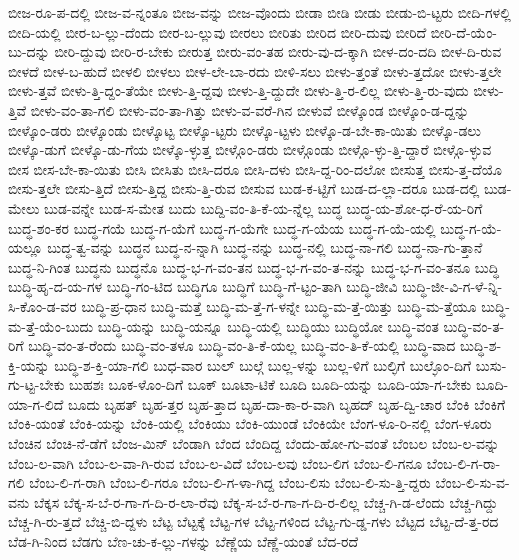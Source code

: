 {ಬೀಜ-ರೂ-ಪ-ದಲ್ಲಿ
ಬೀಜ-ವ-ನ್ನಂತೂ
ಬೀಜ-ವನ್ನು
ಬೀಜ-ವೊಂದು
ಬೀಡಾ
ಬೀಡಿ
ಬೀಡು
ಬೀಡು-ಬಿ-ಟ್ಟರು
ಬೀದಿ-ಗಳಲ್ಲಿ
ಬೀದಿ-ಯಲ್ಲಿ
ಬೀರ-ಬ-ಲ್ಲು-ದೆಂದು
ಬೀರ-ಬ-ಲ್ಲುವು
ಬೀರಲು
ಬೀರಿತು
ಬೀರಿದ
ಬೀರಿ-ದುವು
ಬೀರಿದೆ
ಬೀರಿ-ದೆ-ಯೆಂ-ಬು-ದನ್ನು
ಬೀರಿ-ದ್ದುವು
ಬೀರಿ-ರ-ಬೇಕು
ಬೀರುತ್ತ
ಬೀರು-ವಂ-ತಹ
ಬೀರು-ವು-ದ-ಕ್ಕಾಗಿ
ಬೀಳ-ದಂ-ದದಿ
ಬೀಳ-ದಿ-ರುವ
ಬೀಳದೆ
ಬೀಳ-ಬ-ಹುದೆ
ಬೀಳಲಿ
ಬೀಳಲು
ಬೀಳ-ಲೇ-ಬಾ-ರದು
ಬೀಳಿ-ಸಲು
ಬೀಳು-ತ್ತಂತೆ
ಬೀಳು-ತ್ತದೋ
ಬೀಳು-ತ್ತಲೇ
ಬೀಳು-ತ್ತವೆ
ಬೀಳು-ತ್ತಿ-ದ್ದಂ-ತೆಯೇ
ಬೀಳು-ತ್ತಿ-ದ್ದವು
ಬೀಳು-ತ್ತಿ-ದ್ದುದೇ
ಬೀಳು-ತ್ತಿ-ರ-ಲಿಲ್ಲ
ಬೀಳು-ತ್ತಿ-ರು-ವುದು
ಬೀಳು-ತ್ತಿವೆ
ಬೀಳು-ವಂ-ತಾ-ಗಲಿ
ಬೀಳು-ವಂ-ತಾ-ಗಿತ್ತು
ಬೀಳು-ವ-ವರೆ-ಗಿನ
ಬೀಳುವೆ
ಬೀಳ್ಕೊಂಡ
ಬೀಳ್ಕೊಂ-ಡ-ದ್ದನ್ನು
ಬೀಳ್ಕೊಂ-ಡರು
ಬೀಳ್ಕೊಂಡು
ಬೀಳ್ಕೊಟ್ಟ
ಬೀಳ್ಕೊ-ಟ್ಟರು
ಬೀಳ್ಕೊ-ಟ್ಟಳು
ಬೀಳ್ಕೊ-ಡ-ಬೇ-ಕಾ-ಯಿತು
ಬೀಳ್ಕೊ-ಡಲು
ಬೀಳ್ಕೊ-ಡುಗೆ
ಬೀಳ್ಕೊ-ಡು-ಗೆಯ
ಬೀಳ್ಕೊ-ಳ್ಳುತ್ತ
ಬೀಳ್ಗೊಂ-ಡರು
ಬೀಳ್ಗೊಂಡು
ಬೀಳ್ಗೊ-ಳ್ಳು-ತ್ತಿ-ದ್ದಾರೆ
ಬೀಳ್ಗೊ-ಳ್ಳುವ
ಬೀಸ
ಬೀಸ-ಬೇ-ಕಾ-ಯಿತು
ಬೀಸಿ
ಬೀಸಿತು
ಬೀಸಿ-ದರೂ
ಬೀಸಿ-ದಳು
ಬೀಸಿ-ದ್ದ-ರಿಂ-ದಲೋ
ಬೀಸುತ್ತ
ಬೀಸು-ತ್ತ-ದೆಯೊ
ಬೀಸು-ತ್ತಲೇ
ಬೀಸು-ತ್ತಿದೆ
ಬೀಸು-ತ್ತಿದ್ದ
ಬೀಸು-ತ್ತಿ-ರುವ
ಬೀಸುವ
ಬುಡ-ಕ-ಟ್ಟಿಗೆ
ಬುಡ-ದ-ಲ್ಲಾ-ದರೂ
ಬುಡ-ದಲ್ಲಿ
ಬುಡ-ಮೇಲು
ಬುಡ-ವನ್ನೇ
ಬುಡ-ಸ-ಮೇತ
ಬುದು
ಬುದ್ದಿ-ವಂ-ತಿ-ಕೆ-ಯ-ನ್ನೆಲ್ಲ
ಬುದ್ಧ
ಬುದ್ಧ-ಯ-ಶೋ-ಧ-ರೆ-ಯ-ರಿಗೆ
ಬುದ್ಧ-ಶಂ-ಕರ
ಬುದ್ಧ-ಗಯೆ
ಬುದ್ಧ-ಗ-ಯೆಗೆ
ಬುದ್ಧ-ಗ-ಯೆಗೇ
ಬುದ್ಧ-ಗ-ಯೆಯ
ಬುದ್ಧ-ಗ-ಯೆ-ಯಲ್ಲಿ
ಬುದ್ಧ-ಗ-ಯೆ-ಯಲ್ಲೂ
ಬುದ್ಧ-ತ್ವ-ವನ್ನು
ಬುದ್ಧನ
ಬುದ್ಧ-ನ-ನ್ನಾಗಿ
ಬುದ್ಧ-ನನ್ನು
ಬುದ್ಧ-ನಲ್ಲಿ
ಬುದ್ಧ-ನಾ-ಗಲಿ
ಬುದ್ಧ-ನಾ-ಗು-ತ್ತಾನೆ
ಬುದ್ಧ-ನಿ-ಗಿಂತ
ಬುದ್ಧನು
ಬುದ್ಧನೊ
ಬುದ್ಧ-ಭ-ಗ-ವಂ-ತನ
ಬುದ್ಧ-ಭ-ಗ-ವಂ-ತ-ನನ್ನು
ಬುದ್ಧ-ಭ-ಗ-ವಂ-ತನೂ
ಬುದ್ಧಿ
ಬುದ್ಧಿ-ಹೃ-ದ-ಯ-ಗಳ
ಬುದ್ಧಿ-ಗಂ-ಟಿದ
ಬುದ್ಧಿಗೂ
ಬುದ್ಧಿಗೆ
ಬುದ್ಧಿ-ಗೆ-ಟ್ಟಂ-ತಾಗಿ
ಬುದ್ಧಿ-ಜೀವಿ
ಬುದ್ಧಿ-ಜೀ-ವಿ-ಗ-ಳೆ-ನ್ನಿ-ಸಿ-ಕೊಂ-ಡ-ವರ
ಬುದ್ಧಿ-ಪ್ರ-ಧಾನ
ಬುದ್ಧಿ-ಮತ್ತೆ
ಬುದ್ಧಿ-ಮ-ತ್ತೆ-ಗ-ಳನ್ನೇ
ಬುದ್ಧಿ-ಮ-ತ್ತೆ-ಯಿತ್ತು
ಬುದ್ಧಿ-ಮ-ತ್ತೆಯೂ
ಬುದ್ಧಿ-ಮ-ತ್ತೆ-ಯೆಂ-ಬುದು
ಬುದ್ಧಿ-ಯನ್ನು
ಬುದ್ಧಿ-ಯನ್ನೂ
ಬುದ್ಧಿ-ಯಲ್ಲಿ
ಬುದ್ಧಿಯು
ಬುದ್ಧಿಯೋ
ಬುದ್ಧಿ-ವಂತ
ಬುದ್ಧಿ-ವಂ-ತ-ರಿಗೆ
ಬುದ್ಧಿ-ವಂ-ತ-ರೆಂದು
ಬುದ್ಧಿ-ವಂ-ತಳೂ
ಬುದ್ಧಿ-ವಂ-ತಿ-ಕೆ-ಯಲ್ಲ
ಬುದ್ಧಿ-ವಂ-ತಿ-ಕೆ-ಯಲ್ಲಿ
ಬುದ್ಧಿ-ವಾದ
ಬುದ್ಧಿ-ಶ-ಕ್ತಿ-ಯನ್ನು
ಬುದ್ಧಿ-ಶ-ಕ್ತಿ-ಯಾ-ಗಲಿ
ಬುಧ-ವಾರ
ಬುಲ್
ಬುಲ್ಗೆ
ಬುಲ್ಲ-ಳನ್ನು
ಬುಲ್ಲ-ಳಿಗೆ
ಬುಲ್ಳಿಗೆ
ಬುಲ್ಳೊಂ-ದಿಗೆ
ಬುಸು-ಗು-ಟ್ಟ-ಬೇಕು
ಬುಹಶಃ
ಬೂಕ-ಳೊಂ-ದಿಗೆ
ಬೂಕ್
ಬೂಟಾ-ಟಿಕೆ
ಬೂದಿ
ಬೂದಿ-ಯನ್ನು
ಬೂದಿ-ಯಾ-ಗ-ಬೇಕು
ಬೂದಿ-ಯಾ-ಗ-ಲಿದೆ
ಬೂದು
ಬೃಹತ್
ಬೃಹ-ತ್ತರ
ಬೃಹ-ತ್ತಾದ
ಬೃಹ-ದಾ-ಕಾ-ರ-ವಾಗಿ
ಬೃಹದ್
ಬೃಹ-ದ್ವಿ-ಚಾರ
ಬೆಂಕಿ
ಬೆಂಕಿಗೆ
ಬೆಂಕಿ-ಯಂತೆ
ಬೆಂಕಿ-ಯನ್ನು
ಬೆಂಕಿ-ಯಲ್ಲಿ
ಬೆಂಕಿಯು
ಬೆಂಕಿ-ಯುಂಡೆ
ಬೆಂಕಿಯೇ
ಬೆಂಗ-ಳೂ-ರಿ-ನಲ್ಲಿ
ಬೆಂಗ-ಳೂರು
ಬೆಂಚಿನ
ಬೆಂಚಿ-ನೆ-ಡೆಗೆ
ಬೆಂಜ-ಮಿನ್
ಬೆಂಡಾಗಿ
ಬೆಂದ
ಬೆಂದಿದ್ದ
ಬೆಂದು-ಹೋ-ಗು-ವಂತೆ
ಬೆಂಬಲ
ಬೆಂಬ-ಲ-ವನ್ನು
ಬೆಂಬ-ಲ-ವಾಗಿ
ಬೆಂಬ-ಲ-ವಾ-ಗಿ-ರುವ
ಬೆಂಬ-ಲ-ವಿದೆ
ಬೆಂಬ-ಲವು
ಬೆಂಬ-ಲಿಗ
ಬೆಂಬ-ಲಿ-ಗನೂ
ಬೆಂಬ-ಲಿ-ಗ-ರಾ-ಗಲಿ
ಬೆಂಬ-ಲಿ-ಗ-ರಾಗಿ
ಬೆಂಬ-ಲಿ-ಗರೂ
ಬೆಂಬ-ಲಿ-ಗ-ಳಾ-ಗಿದ್ದ
ಬೆಂಬ-ಲಿಸು
ಬೆಂಬ-ಲಿ-ಸು-ತ್ತಿ-ದ್ದರು
ಬೆಂಬ-ಲಿ-ಸು-ವ-ವನು
ಬೆಕ್ಕಸ
ಬೆಕ್ಕ-ಸ-ಬೆ-ರ-ಗಾ-ಗ-ದಿ-ರ-ಲಾ-ರೆವು
ಬೆಕ್ಕ-ಸ-ಬೆ-ರ-ಗಾ-ಗ-ದಿ-ರ-ಲಿಲ್ಲ
ಬೆಚ್ಚ-ಗಿ-ಡ-ಲೆಂದು
ಬೆಚ್ಚ-ಗಿದ್ದು
ಬೆಚ್ಚ-ಗಿ-ರು-ತ್ತದೆ
ಬೆಚ್ಚಿ-ಬಿ-ದ್ದಳು
ಬೆಟ್ಟ
ಬೆಟ್ಟಕ್ಕೆ
ಬೆಟ್ಟ-ಗಳ
ಬೆಟ್ಟ-ಗಳಿಂದ
ಬೆಟ್ಟ-ಗು-ಡ್ಡ-ಗಳು
ಬೆಟ್ಟದ
ಬೆಟ್ಟ-ದೆ-ತ್ತ-ರದ
ಬೆಡ-ಗಿ-ನಿಂದ
ಬೆಡಗು
ಬೆಣ-ಚು-ಕ-ಲ್ಲು-ಗಳನ್ನು
ಬೆಣ್ಣೆಯ
ಬೆಣ್ಣೆ-ಯಂತೆ
ಬೆದ-ರದೆ
}
